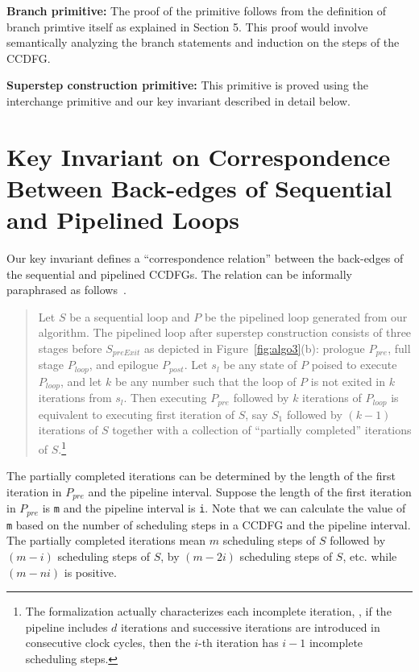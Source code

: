{\bf Branch primitive:} The proof of the primitive follows from the definition of branch primtive itself as explained in Section 5. This proof would involve semantically analyzing the branch statements and induction on the steps of the CCDFG. 

{\bf Superstep construction primitive:} This primitive is proved
using the interchange primitive and our key invariant described in detail below.

\section{Key Invariant on Correspondence Between Back-edges of Sequential and Pipelined Loops}
 Our key invariant defines a ``correspondence relation''
between the back-edges of the sequential and pipelined CCDFGs.
The relation can be informally paraphrased as
follows~\cite{disha-itp14}.

\begin{quote}
Let $S$ be a sequential loop and $P$ be the pipelined loop
generated from our algorithm. The pipelined loop after superstep construction
consists of
three stages before $S_{preExit}$ as depicted in
Figure~\ref{fig:algo3}(b): prologue $P_{pre}$, full stage
$P_{loop}$, and epilogue $P_{post}$.  Let $s_l$ be any state of $P$
poised to execute $P_{loop}$, and let $k$ be any number such that
the loop of $P$ is not exited in $k$ iterations from $s_l$.
Then executing $P_{pre}$ followed by $k$ iterations of $P_{loop}$ is
equivalent to executing first iteration of $S$, say $S_1$
followed by $(k - 1)$ iterations of $S$ together with a
collection of ``partially completed'' iterations of
$S$.\footnote{The formalization actually characterizes each
  incomplete iteration, \eg, if the pipeline includes $d$
  iterations and successive iterations are introduced in
  consecutive clock cycles, then the $i$-th iteration has $i
  - 1$ incomplete scheduling steps.}
\end{quote}

The partially completed iterations can be determined by the
length of the first iteration in $P_{pre}$ and the pipeline interval.
Suppose the length of the first iteration in $P_{pre}$
is {\tt m} and the pipeline interval is {\tt i}. Note that we
can calculate the value of {\tt m} based on the number of scheduling steps in a CCDFG
and the pipeline interval. The partially completed iterations mean $m$
scheduling steps of $S$ followed by $(m-i)$ scheduling steps of $S$, by
$(m-2i)$ scheduling steps of $S$, etc. while $(m-ni)$ is positive.

